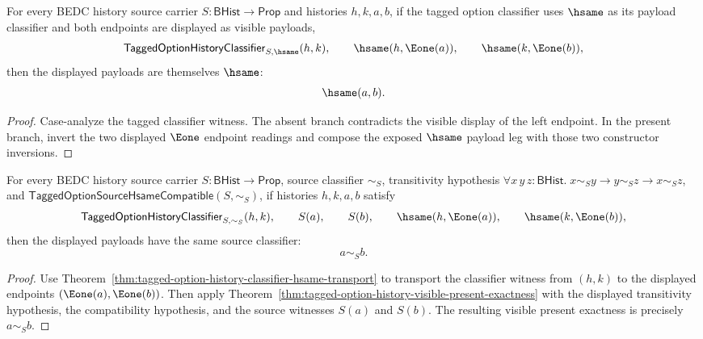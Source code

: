 \begin{theorem}
\label{thm:tagged-option-history-classifier-hsame-visible-payload-exactness}
For every BEDC history source carrier $S:\mathsf{BHist}\to\mathsf{Prop}$ and
histories $h,k,a,b$, if the tagged option classifier uses $\hsame$ as its
payload classifier and both endpoints are displayed as visible payloads,
$$
\mathsf{TaggedOptionHistoryClassifier}_{S,\hsame}(h,k),
\qquad
\hsame(h,\Eone(a)),
\qquad
\hsame(k,\Eone(b)),
$$
then the displayed payloads are themselves $\hsame$:
$$
\hsame(a,b).
$$
\end{theorem}
\begin{proof}
Case-analyze the tagged classifier witness. The absent branch contradicts the
visible display of the left endpoint. In the present branch, invert the two
displayed $\Eone$ endpoint readings and compose the exposed $\hsame$ payload
leg with those two constructor inversions.
\end{proof}

\begin{theorem}
\label{thm:tagged-option-history-classifier-presented-payload-exactness}
For every BEDC history source carrier $S:\mathsf{BHist}\to\mathsf{Prop}$,
source classifier $\sim_S$, transitivity hypothesis
$\forall x\,y\,z:\mathsf{BHist}.\;x\sim_S y\to y\sim_S z\to x\sim_S z$,
and
$\mathsf{TaggedOptionSourceHsameCompatible}(S,\sim_S)$, if histories $h,k,a,b$
satisfy
$$
\mathsf{TaggedOptionHistoryClassifier}_{S,\sim_S}(h,k),
\qquad
S(a),\qquad
S(b),\qquad
\hsame(h,\Eone(a)),\qquad
\hsame(k,\Eone(b)),
$$
then the displayed payloads have the same source classifier:
$$
a\sim_S b.
$$
\end{theorem}
\begin{proof}
Use Theorem~\ref{thm:tagged-option-history-classifier-hsame-transport} to
transport the classifier witness from $(h,k)$ to the displayed endpoints
$(\Eone(a),\Eone(b))$. Then apply
Theorem~\ref{thm:tagged-option-history-visible-present-exactness} with the
displayed transitivity hypothesis, the compatibility hypothesis,
and the source witnesses $S(a)$ and $S(b)$. The resulting visible present
exactness is precisely $a\sim_S b$.
\end{proof}

